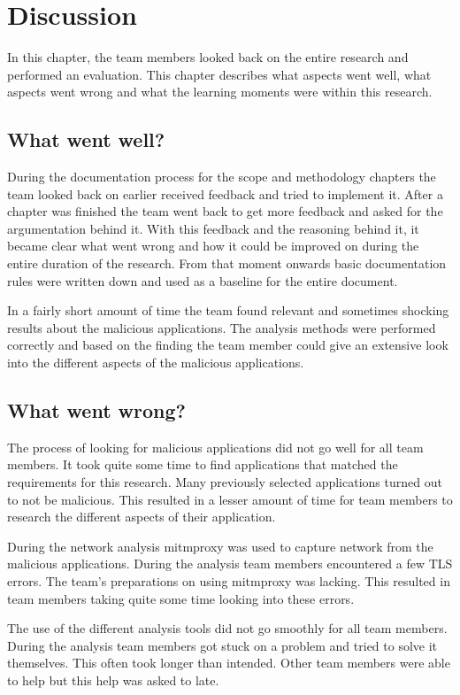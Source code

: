 \section{Discussion}
In this chapter, the team members looked back on the entire research and performed an evaluation.
This chapter describes what aspects went well, what aspects went wrong and what the learning moments were within this research.

\subsection{What went well?}
During the documentation process for the scope and methodology chapters the team looked back on earlier received feedback and tried to implement it.
After a chapter was finished the team went back to get more feedback and asked for the argumentation behind it.
With this feedback and the reasoning behind it, it became clear what went wrong and how it could be improved on during the entire duration of the research.
From that moment onwards basic documentation rules were written down and used as a baseline for the entire document.

In a fairly short amount of time the team found relevant and sometimes shocking results about the malicious applications.
The analysis methods were performed correctly and based on the finding the team member could give an extensive look into the different aspects of the malicious applications.

\subsection{What went wrong?}
The process of looking for malicious applications did not go well for all team members.
It took quite some time to find applications that matched the requirements for this research.
Many previously selected applications turned out to not be malicious.
This resulted in a lesser amount of time for team members to research the different aspects of their application.

During the network analysis mitmproxy was used to capture network from the malicious applications.
During the analysis team members encountered a few TLS errors.
The team’s preparations on using mitmproxy was lacking.
This resulted in team members taking quite some time looking into these errors.

The use of the different analysis tools did not go smoothly for all team members.
During the analysis team members got stuck on a problem and tried to solve it themselves.
This often took longer than intended.
Other team members were able to help but this help was asked to late.

